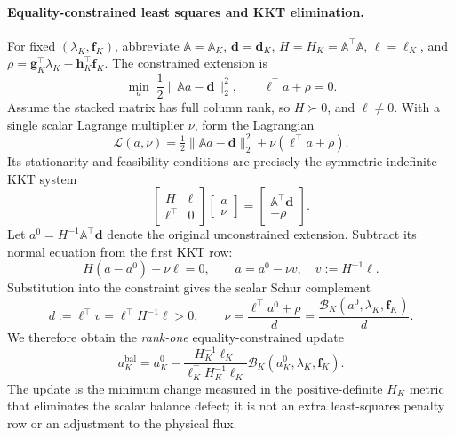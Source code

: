 \documentclass[11pt]{article}
\begin{document}
\paragraph{Equality-constrained least squares and KKT elimination.}
For fixed $(\lambda_K,\bm f_K)$, abbreviate
$\mathbb A=\mathbb A_K$, $\bm d=\bm d_K$,
$H=H_K=\mathbb A^\top\mathbb A$, $\ell=\bm\ell_K$, and
$\rho=\bm g_K^\top\lambda_K-\bm h_K^\top\bm f_K$.
The constrained extension is
\begin{equation}\label{eq:full_balance_constrained_problem}
 \min_a\;\frac12\|\mathbb Aa-\bm d\|_2^2,
 \qquad \ell^\top a+\rho=0.
\end{equation}
Assume the stacked matrix has full column rank, so $H\succ0$,
and $\ell\ne0$.  With a single scalar Lagrange multiplier $\nu$,
form the Lagrangian
\begin{equation}\label{eq:full_balance_lagrangian}
 \mathscr L(a,\nu)=\tfrac12\|\mathbb Aa-\bm d\|_2^2
     +\nu(\ell^\top a+\rho).
\end{equation}
Its stationarity and feasibility conditions are precisely the
symmetric indefinite KKT system
\begin{equation}\label{eq:full_balance_KKT}
 \begin{bmatrix}H&\ell\\\ell^\top&0\end{bmatrix}
 \begin{bmatrix}a\\\nu\end{bmatrix}
 =\begin{bmatrix}\mathbb A^\top\bm d\\-\rho\end{bmatrix}.
\end{equation}
Let $a^0=H^{-1}\mathbb A^\top\bm d$ denote the original
unconstrained extension.  Subtract its normal equation from the first
KKT row:
\begin{equation}\label{eq:full_balance_KKT_elim}
 H(a-a^0)+\nu\ell=0,
 \qquad a=a^0-\nu v,\quad v:=H^{-1}\ell.
\end{equation}
Substitution into the constraint gives the scalar Schur complement
\begin{equation}\label{eq:full_balance_multiplier}
 d:=\ell^\top v=\ell^\top H^{-1}\ell>0,
 \qquad\nu=\frac{\ell^\top a^0+\rho}{d}
 =\frac{\mathcal B_K(a^0,\lambda_K,\bm f_K)}{d}.
\end{equation}
We therefore obtain the \emph{rank-one} equality-constrained update
\begin{equation}\label{eq:full_balance_rank_one}
 \boxed{a_K^{\mathrm{bal}}=a_K^0
 -\frac{H_K^{-1}\bm\ell_K}
 {\bm\ell_K^\top H_K^{-1}\bm\ell_K}
 \mathcal B_K(a_K^0,\lambda_K,\bm f_K).}
\end{equation}
The update is the minimum change measured in the positive-definite
$H_K$ metric that eliminates the scalar balance defect; it is not an
extra least-squares penalty row or an adjustment to the physical flux.
\end{document}
